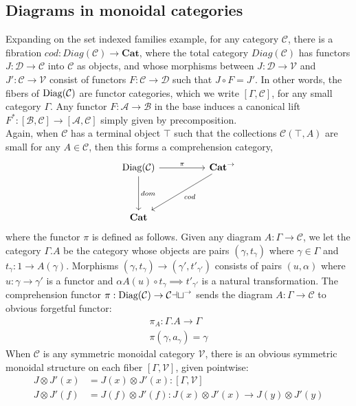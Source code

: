 \subsection{Diagrams in monoidal categories}
Expanding on the set indexed families example, for any category $\mathcal{C}$, there is a fibration $cod : Diag(\mathcal{C}) \to \mathbf{Cat}$, where the total category $Diag(\mathcal{C})$ has functors $J : \mathcal{D} \to \mathcal{C}$ into $\mathcal{C}$ as objects, and whose morphisms between $J : \mathcal{D} \to \mathcal{V}$ and $J' :\mathcal{C} \to \mathcal{V}$ consist of functors $F : \mathcal{C} \to \mathcal{D}$ such that $J \circ F = J'$. In other words, the fibers of $\operatorname{\text{Diag}}(\mathcal{C})$ are functor categories, which we write $[\Gamma, \mathcal{C}]$, for any small category $\Gamma$. Any functor $F : \mathcal{A} \to \mathcal{B}$ in the base induces a canonical lift $F^* : [\mathcal{B}, \mathcal{C}] \to [\mathcal{A},\mathcal{C}]$ simply given by precomposition.\\
Again, when $\mathcal{C}$ has a terminal object $\top$ such that the collections $\mathcal{C}(\top, A)$ are small for any $A \in \mathcal{C}$, then this forms a comprehension category,
\[
\ti
\diag(\mathcal{C}) \ar[d, "dom"] \ar[r,"\pi"] & \mathbf{Cat}^\to \ar[ld, "cod"] \\
\mathbf{Cat}
\kz
\]
 where the functor $\pi$ is defined as follows. Given any diagram $A : \Gamma \to \mathcal{C}$, we let the category $\Gamma.A$ be the category whose objects are pairs $(\gamma, t_\gamma)$ where $\gamma \in \Gamma$ and $t_\gamma : 1 \to A(\gamma)$. Morphisms $(\gamma, t_\gamma) \to (\gamma', t'_{\gamma'})$ consists of pairs $(u, \alpha)$ where $u : \gamma \to \gamma'$ is a functor and $\alpha A(u) \circ t_\gamma \implies t'_{\gamma'}$ is a natural transformation. The comprehension functor $\pi : \operatorname{\text{Diag}}(\mathcal{C}) \to \mathcal{Cat}^\to$ sends the diagram $A : \Gamma \to \mathcal{C}$ to obvious forgetful functor:
 \[
   \begin{split}
     \pi_A : \Gamma.A \to \Gamma\\
     \pi(\gamma, a_\gamma) = \gamma
     \end{split}
\]
When $\mathcal{C}$ is any symmetric monoidal category $\mathcal{V}$, there is an obvious symmetric monoidal structure on each fiber $[\Gamma, \mathcal{V}]$, given pointwise:
\[
  \begin{split}
    J \otimes J'(x) &= J(x) \otimes J'(x) : [\Gamma, \mathcal{V}]\\
    J \otimes J'(f) &= J(f) \otimes J'(f) : J(x) \otimes J'(x) \to J(y) \otimes J'(y)
  \end{split}
  \]
